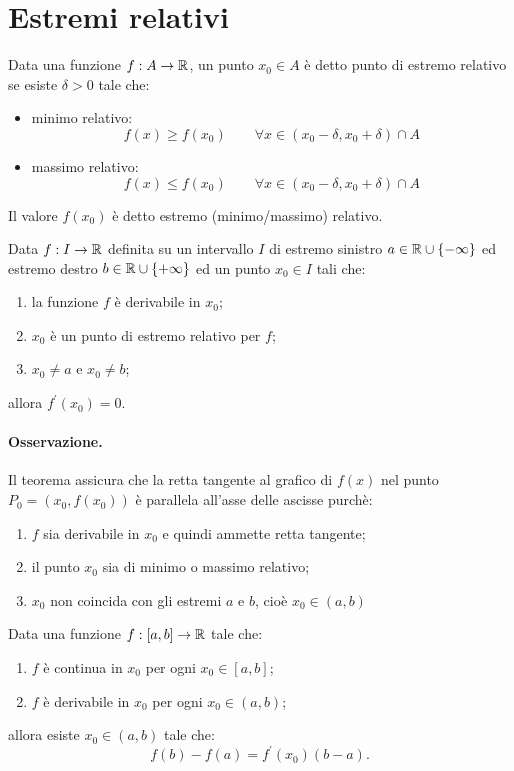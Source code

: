 \section{Estremi relativi}
Data una funzione $f:A\rightarrow\mathbb{R}$, un punto $x_0\in A$ è detto punto di estremo relativo se esiste $\delta> 0$ tale che:
\begin{itemize}
\item minimo relativo:
\[f(x)\geq f(x_0) \qquad \forall x\in (x_0 - \delta, x_0 + \delta) \cap A\]
\item massimo relativo:
\[f(x)\leq f(x_0) \qquad \forall x\in (x_0 - \delta, x_0 + \delta) \cap A\]
\end{itemize}
Il valore $f(x_0)$ è detto estremo (minimo/massimo) relativo.

\begin{teo}
Data $f:I\rightarrow\mathbb{R}$ definita su un intervallo $I$ di estremo sinistro $a \in \mathbb{R} \cup\{-\infty\}$ ed estremo destro $b \in \mathbb{R} \cup\{+\infty\}$ ed un punto $x_0\in I$ tali che:
\begin{enumerate}
\item la funzione $f$ è derivabile in $x_0$;
\item $x_0$ è un punto di estremo relativo per $f$;
\item $x_0\neq a$ e $x_0\neq b$;
\end{enumerate}
allora $f^\prime(x_0)=0$.
\paragraph{Osservazione.}
Il teorema assicura che la retta tangente al grafico di $f(x)$ nel punto $P_0 = (x_0,f(x_0))$ è parallela all'asse delle ascisse purchè:
\begin{enumerate}
\item $f$ sia derivabile in $x_0$ e quindi ammette retta tangente;
\item il punto $x_0$ sia di minimo o massimo relativo;
\item $x_0$ non coincida con gli estremi $a$ e $b$, cioè $x_0 \in (a,b)$
\end{enumerate}
\end{teo}

\begin{teo}
Data una funzione $f:[a,b]\rightarrow \mathbb{R}$ tale che:
\begin{enumerate}
\item $f$ è continua in $x_0$ per ogni $x_0\in[a,b]$;
\item $f$ è derivabile in $x_0$ per ogni $x_0\in(a,b)$;
\end{enumerate}
allora esiste $x_0\in (a,b)$ tale che:
\[f(b)-f(a)=f^\prime(x_0)(b-a).\]
\end{teo}

